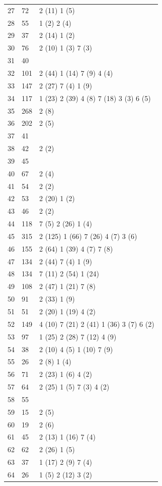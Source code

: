 \begin{landscape}
\begin{longtable}{|p{1.5cm}|p{1.25cm}|p{21cm}|}
27 & 72 & 2 (11) 1 (5) \\
28 & 55 & 1 (2) 2 (4) \\
29 & 37 & 2 (14) 1 (2) \\
30 & 76 & 2 (10) 1 (3) 7 (3) \\
31 & 40 & \\
32 & 101 & 2 (44) 1 (14) 7 (9) 4 (4) \\
33 & 147 & 2 (27) 7 (4) 1 (9) \\
34 & 117 & 1 (23) 2 (39) 4 (8) 7 (18) 3 (3) 6 (5) \\
35 & 268 & 2 (8) \\
36 & 202 & 2 (5) \\
37 & 41 & \\
38 & 42 & 2 (2) \\
39 & 45 & \\
40 & 67 & 2 (4) \\
41 & 54 & 2 (2) \\
42 & 53 & 2 (20) 1 (2) \\
43 & 46 & 2 (2) \\
44 & 118 & 7 (5) 2 (26) 1 (4) \\
45 & 315 & 2 (125) 1 (66) 7 (26) 4 (7) 3 (6) \\
46 & 155 & 2 (64) 1 (39) 4 (7) 7 (8) \\
47 & 134 & 2 (44) 7 (4) 1 (9) \\
48 & 134 & 7 (11) 2 (54) 1 (24) \\
49 & 108 & 2 (47) 1 (21) 7 (8) \\
50 & 91 & 2 (33) 1 (9) \\
51 & 51 & 2 (20) 1 (19) 4 (2) \\
52 & 149 & 4 (10) 7 (21) 2 (41) 1 (36) 3 (7) 6 (2) \\
53 & 97 & 1 (25) 2 (28) 7 (12) 4 (9) \\
54 & 38 & 2 (10) 4 (5) 1 (10) 7 (9) \\
55 & 26 & 2 (8) 1 (4) \\
56 & 71 & 2 (23) 1 (6) 4 (2) \\
57 & 64 & 2 (25) 1 (5) 7 (3) 4 (2) \\
58 & 55 & \\
59 & 15 & 2 (5) \\
60 & 19 & 2 (6) \\
61 & 45 & 2 (13) 1 (16) 7 (4) \\
62 & 62 & 2 (26) 1 (5) \\
63 & 37 & 1 (17) 2 (9) 7 (4) \\
64 & 26 & 1 (5) 2 (12) 3 (2) \\

\end{longtable}
\end{landscape}
